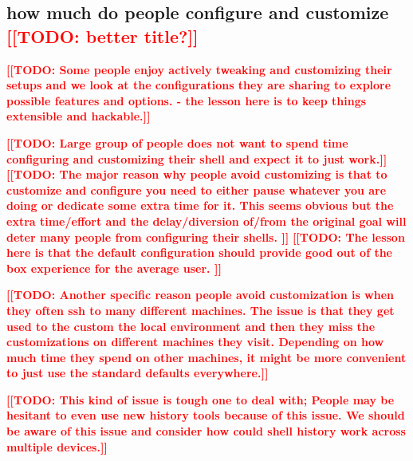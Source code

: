 \documentclass[thesis=M,english]{FITthesis}[2012/10/20]
\newcommand{\todotext}[1]{\textcolor{red}{\textbf{[[#1]]}}}
\newcommand{\redtext}[1]{\textcolor{red}{[[#1]]}}
\begin{document}
\subsection{how much do people configure and customize \redtext{TODO: better title?}} 
\todotext{TODO: Some people enjoy actively tweaking and customizing their setups and we look at the configurations they are sharing to explore possible features and options. - the lesson here is to keep things extensible and hackable.}

\todotext{TODO: Large group of people does not want to spend time configuring and customizing their shell and expect it to just work.}
\todotext{TODO: The major reason why people avoid customizing is that to customize and configure you need to either pause whatever you are doing or dedicate some extra time for it. This seems obvious but the extra time/effort and the delay/diversion of/from the original goal will deter many people from configuring their shells. }
\todotext{TODO: The lesson here is that the default configuration should provide good out of the box experience for the average user. }

\todotext{TODO: Another specific reason people avoid customization is when they often ssh to many different machines. The issue is that they get used to the custom the local environment and then they miss the customizations on different machines they visit. Depending on how much time they spend on other machines, it might be more convenient to just use the standard defaults everywhere.}

\todotext{TODO: This kind of issue is tough one to deal with; People may be hesitant to even use new history tools because of this issue. We should be aware of this issue and consider how could shell history work across multiple devices.}







\end{document}
